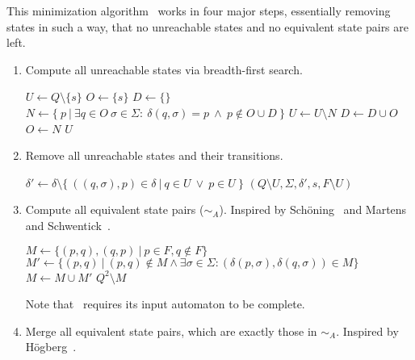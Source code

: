 This minimization algorithm \MinAlg\ works in four major steps, essentially removing states in such a way, that no unreachable states and no equivalent state pairs are left.
\begin{enumerate}
	\item Compute all unreachable states via breadth-first search.
	
	\vspace{0.2cm}
	\begin{algorithmic}[1]
			\State $U \gets Q \setminus \{s\}$	
			\State $O \gets \{s\}$				
			\State $D \gets \{\}$				
				\State $N \gets \{\ p\ | \ \exists q \in O\ \sigma \in \Sigma \colon\ \delta(q, \sigma) = p\ \land\ p \notin O \cup D\ \}$
				\State $U \gets U \setminus N$
				\State $D \gets D \cup O$
				\State $O \gets N$
			\EndWhile
			\State \Return $U$
		\EndFunction
	\end{algorithmic}

	\item Remove all unreachable states and their transitions.
	
	\vspace{0.2cm}
	\begin{algorithmic}[1]
            \State $\delta' \gets \delta \setminus \{\ ((q,\sigma),p)\in\delta\ |\ q\in U\ \lor\ p\in U\ \}$
			\State \Return $(Q \setminus U, \Sigma, \delta', s, F \setminus U)$
		\EndFunction
	\end{algorithmic}

	\item Compute all equivalent state pairs ($\sim_A$). Inspired by Schöning~\cite[p. 46]{Sch01} and Martens and Schwentick~\cite[p. 17]{MS18}.
	\vspace{0.2cm}
	\begin{algorithmic}[1]
		 \label{ch:1:minmark}
		\State $M \gets \{ (p,q), (q,p)\ |\ p \in F, q \notin F \}$
		\Do
			\State $M' \gets \{ (p,q)\ |\ (p,q) \notin M \land \exists \sigma \in \Sigma \colon (\delta(p,\sigma), \delta(q,\sigma)) \in M \}$
			\State $M \gets M \cup M'$
		\State \Return $Q^2 \setminus M$
		\EndFunction
	\end{algorithmic}
	Note that \CompDist\ requires its input automaton to be complete. 

	\item Merge all equivalent state pairs, which are exactly those in $\sim_A$. Inspired by Högberg~\cite[p. 10]{HL20}.
	

\end{enumerate}
